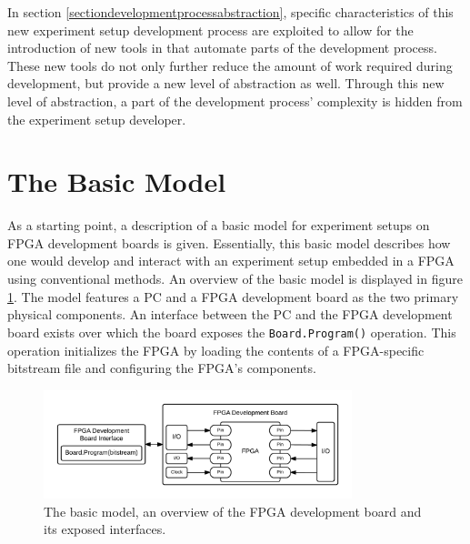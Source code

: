 \documentclass[main.tex]{subfiles}
\begin{document}
In section \ref{sectiondevelopmentprocessabstraction}, specific characteristics of this new experiment setup development process are exploited to allow for the introduction of new tools in that automate parts of the development process. These new tools do not only further reduce the amount of work required during development, but provide a new level of abstraction as well. Through this new level of abstraction, a part of the development process' complexity is hidden from the experiment setup developer.

\section{The Basic Model}
\label{sectionbasicmodel}



As a starting point, a description of a basic model for experiment setups on FPGA development boards is given. Essentially, this basic model describes how one would develop and interact with an experiment setup embedded in a FPGA using conventional methods. An overview of the basic model is displayed in figure \ref{fig:overview-basic}. The model features a PC and a FPGA development board as the two primary physical components. An interface between the PC and the FPGA development board exists over which the board exposes the \texttt{Board.Program()} operation. This operation initializes the FPGA by loading the contents of a FPGA-specific bitstream file and configuring the FPGA's components. 


\begin{figure}[h]
    \centering
    \caption{The basic model, an overview of the FPGA development board and its exposed interfaces.}
    \label{fig:overview-basic}
    \includegraphics[width=0.8\textwidth]{img/overview-basic}
\end{figure}
\end{document}
